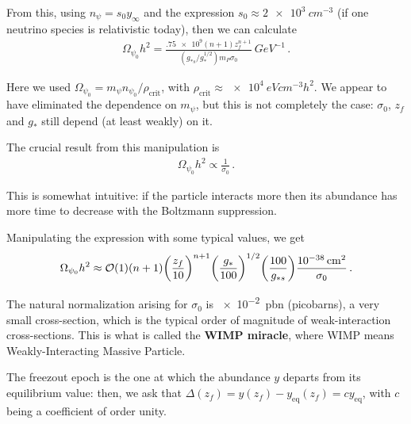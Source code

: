 \documentclass[main.tex]{subfiles}
\begin{document}
From this, using \(n_\psi = s_0 y_\infty \) and the expression \(s_0 \approx \SI{2e3}{cm^{-3}}\) (if one neutrino species is relativistic today), then we can calculate 
%
\begin{align}
\Omega_{\psi_0 } h^2 = \frac{\num{.75e9}(n+1)z_f^{n+1}}{(g_{*s} / g_*^{1/2}) m_P  \sigma_0} \SI{}{GeV^{-1}} 
\,.
\end{align}

Here we used \(\Omega _{\psi_0 } = m_\psi n_{\psi_0 }  / \rho _{\text{crit}}\), with \(\rho _{\text{crit}} \approx \SI{e4}{eV cm^{-3} h^2}\).
We appear to have eliminated the dependence on \(m_\psi \), but this is not completely the case: \(\sigma_0\), \(z_f\) and \(g_*\) still depend (at least weakly) on it. 

The crucial result from this manipulation is 
%
\begin{align}
\Omega_{\psi_0 } h^2 \propto \frac{1}{\sigma_0 }
\,.
\end{align}

This is somewhat intuitive: if the particle interacts more then its abundance has more time to decrease with the Boltzmann suppression. 

Manipulating the expression with some typical values, we get 
%
\begin{align}
\Omega_{\psi_0} h^2 \approx \order{1} (n+1) \qty(\frac{z_f}{10})^{n+1}
\qty(\frac{g_*}{100})^{1/2} \qty(\frac{100}{g_{*s}}) \frac{\SI{e-38}{cm^2}}{\sigma_0 }
\,.
\end{align}

The natural normalization arising for \(\sigma_0\) is \SI{e-2}{pbn} (picobarns), a very small cross-section, which is the typical order of magnitude of weak-interaction cross-sections. 
This is what is called the \textbf{WIMP miracle}, where WIMP means Weakly-Interacting Massive Particle.

The freezout epoch is the one at which the abundance \(y\) departs from its equilibrium value: then, we ask that \(\Delta (z_f) = y(z_f) - y _{\text{eq}} (z_f) = c y _{\text{eq}}\), with \(c\) being a coefficient of order unity.
\end{document}
